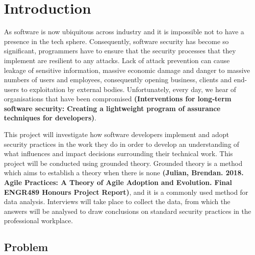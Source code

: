 \chapter{Introduction}\label{C:intro}

\par As software is now ubiquitous across industry and it is impossible not to have a presence in the tech sphere. Consequently, software security has become so significant, programmers have to ensure that the security processes that they implement are resilient to any attacks. Lack of attack prevention can cause leakage of sensitive information, massive economic damage and danger to massive numbers of users and employees, consequently opening business, clients and end-users to exploitation by external bodies. Unfortunately, every day, we hear of organisations that have been compromised \textbf{(Interventions for long‐term software security: Creating a lightweight program of assurance techniques for developers)}.
\newline
\par This project will investigate how software developers implement and adopt security practices in the work they do in order to develop an understanding of what influences and impact decisions surrounding their technical work. This project will be conducted using grounded theory. Grounded theory is a method which aims to establish a theory when there is none \textbf{(Julian, Brendan. 2018. Agile Practices: A Theory of Agile Adoption and Evolution. Final ENGR489 Honours Project Report)}, and it is a commonly used method for data analysis. Interviews will take place to collect the data, from which the answers will be analysed to draw conclusions on standard security practices in the professional workplace.

\section{Problem}

